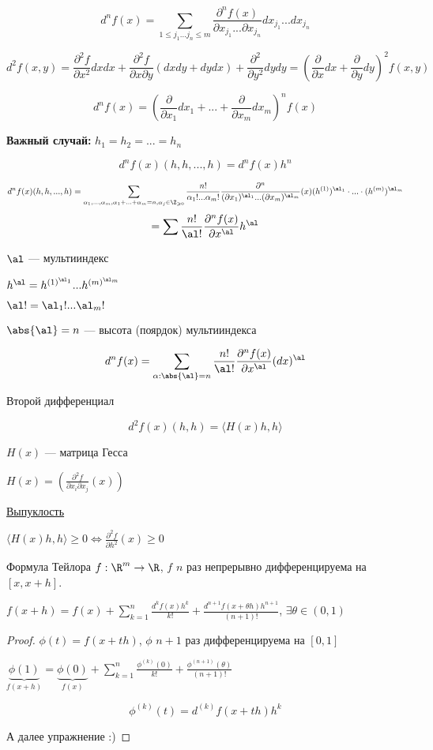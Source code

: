 \[
    d^n  f(x) = \sum_{1 \leqslant j_1 ... j_n \leqslant m} \frac{\partial ^ n f(x)}{\partial x_{j_1} ... \partial x_{j_n}} d x_{j_1} ... dx_{j_n}
\]

\[
    d ^ 2 f(x, y) = \frac{\partial ^ 2 f}{\partial x ^ 2} dx dx + \frac{\partial^2 f}{\partial x \partial y }(dx dy + dy dx) + \frac{\partial ^ 2 }{\partial y ^ 2}  dy dy =
    \left (\frac{\partial}{\partial x} dx + \frac{\partial }{\partial y} dy \right) ^ 2 f(x, y)
\]

\[
    d^n f(x) = \left( \frac{\partial}{\partial x_1} dx_1 + ... + \frac{\partial}{\partial x_m} dx_m  \right) ^ n f(x)
\]

\quad

\textbf{Важный случай:}  $h_1 = h_2 = ... = h_n$

\[
    d ^ n f(x) (h, h, ..., h) = d ^ n f(x) h ^ n
\]

\[
    d ^ n f(x) (h, h, ..., h) = \sum_{\alpha_1, ..., \alpha_m, \alpha_1 + ... + \alpha_m = n, \alpha_j \in \Z_{\geqslant 0}} \frac{n !}{\alpha_1 ! ... \alpha_m !}
     \frac{\partial ^ n}{(\partial x_1) ^ {\al_1} ... (\partial x_m) ^ {\al_m}} (x) (h ^ {(1)}) ^ {\al_1} \cdot ... \cdot (h ^ {(m)}) ^ {\al_m}
\]
\[     
     = \sum \frac{n !}{\al !} \frac{\partial ^ n f(x)}{\partial x ^ \al} h ^ \al
\]

$\al$ --- мультииндекс

$h^\al = h^{(1)^{\al_1}} ... h^{(m)^{\al_m}}$

$\al ! = \al_1 ! ... \al_m !$

$\abs{\al} = n$ --- высота (поярдок) мультииндекса

\[
    d ^ n f(x) = \sum_{\alpha : \abs{\al} = n}
    \frac{n !}{\al !} \frac{\partial ^ n f(x)}{\partial x ^ \al} (dx) ^ \al
\]

Второй дифференциал

\[
    d ^ 2 f(x) (h, h) = \langle H(x) h, h \rangle
\]

$H(x)$ --- матрица Гесса 

$H(x) = (\frac{\partial ^ 2 f}{\partial x_i \partial x_j}(x))$

\underline{Выпуклость}

$\langle H(x) h, h \rangle \geqslant 0 \Longleftrightarrow \frac{\partial ^2 f}{\partial h^2}(x) \geqslant 0$

\begin{namedtheorem}{Формула Тейлора}
    $f : \R ^ m \to \R$, $f$ $n$ раз непрерывно дифференцируема на $[x, x + h]$.

    $f(x + h) = f(x) + \sum_{k = 1} ^ n \frac{d ^ k f(x) h ^ k}{k !} + \frac{d ^ {n + 1} f(x + \theta h) h ^ {n + 1}}{(n + 1)!}$, $\exists \theta \in (0, 1)$
\end{namedtheorem}

\begin{proof}
    $\phi(t) = f(x + th)$, $\phi$ $n + 1$ раз дифференцируема на $[0, 1]$

    $\underbrace{\phi(1)}_{f(x + h)} = \underbrace{\phi(0)}_{f(x)} + \sum_{k = 1} ^ n \frac{\phi^{(k)} (0)}{k !} + \frac{\phi^{(n + 1)}(\theta)}{(n + 1)!}$


    \[
        \phi^{(k)}(t) = d^{(k)} f(x + th) h ^ k
    \]

    А далее упражнение :)
\end{proof}